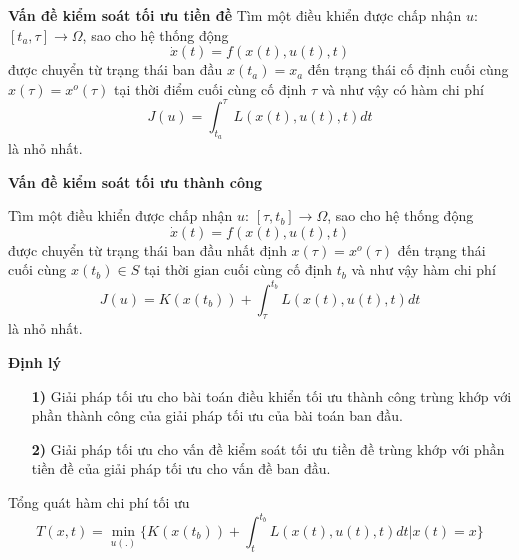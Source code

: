 \documentclass[11pt]{beamer}
\begin{document}
\begin{frame}
	\begin{block}{\textbf{Vấn đề kiểm soát tối ưu tiền đề}}
		Tìm một điều khiển được chấp nhận $u$: $[t_a, \tau] \to \Omega$, sao cho hệ thống động 
		\begin{equation}
			\dot{x}(t) = f(x(t),u(t),t)
		\end{equation}
		được chuyển từ trạng thái ban đầu $x(t_a) = x_a$ đến trạng thái cố định cuối cùng $x(\tau) = x^o(\tau)$ tại thời điểm cuối cùng cố định $\tau$ và như vậy có hàm chi phí 
		\begin{equation}
		J(u) = \int_{t_a}^{\tau}L(x(t),u(t),t)dt
		\end{equation} là nhỏ nhất.
	\end{block}
\end{frame}

\begin{frame}
	\begin{block}{\textbf{Vấn đề kiểm soát tối ưu thành công}}
		
		Tìm một điều khiển được chấp nhận $u$: $[\tau, t_b] \to \Omega$, sao cho hệ thống động \begin{equation}
			\dot{x}(t) = f(x(t),u(t),t)
		\end{equation}
		được chuyển từ trạng thái ban đầu nhất định $x(\tau) = x^o(\tau)$ đến trạng thái cuối cùng $x(t_b) \in S$ tại thời gian cuối cùng cố định $t_b$ và như vậy hàm chi phí 
		\begin{equation}
		J(u) = K(x(t_b)) + \int_{\tau}^{t_b}L(x(t),u(t),t)dt
		\end{equation} là nhỏ nhất.
	\end{block}

\end{frame}

\begin{frame}
	\begin{block}{\textbf{Định lý}}
		\begin{itemize}
			\item[\textbf{1)}] Giải pháp tối ưu cho bài toán điều khiển tối ưu thành công trùng khớp với phần thành công của giải pháp tối ưu của bài toán ban đầu.
			\item[\textbf{2)}] Giải pháp tối ưu cho vấn đề kiểm soát tối ưu tiền đề trùng khớp với phần tiền đề của giải pháp tối ưu cho vấn đề ban đầu. 
		\end{itemize}
	\end{block}
Tổng quát hàm chi phí tối ưu
\begin{equation}
	T(x,t) = \min_{u(.)} \bigg\{K(x(t_b)) + \int_{t}^{t_b}L(x(t),u(t),t)dt \big | x(t) = x \bigg\}
\end{equation} 
\end{frame}
\end{document}

